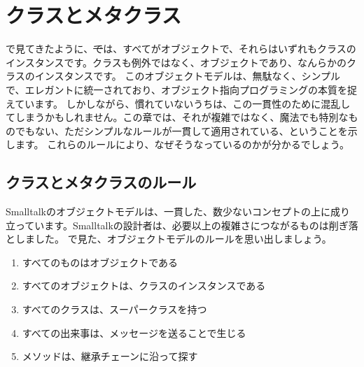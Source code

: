 \documentclass[a4paper,10pt,twoside]{book}
\begin{document}
	\renewcommand{\nnbb}[2]{} %
	\sloppy
\fi
\chapter{クラスとメタクラス}


で見てきたように、\st では、すべてがオブジェクトで、それらはいずれもクラスのインスタンスです。クラスも例外ではなく、オブジェクトであり、なんらかのクラスのインスタンスです。
このオブジェクトモデルは、無駄なく、シンプルで、エレガントに統一されており、オブジェクト指向プログラミングの本質を捉えています。
しかしながら、慣れていないうちは、この一貫性のために混乱してしまうかもしれません。この章では、それが複雑ではなく、魔法でも特別なものでもない、ただシンプルなルールが一貫して適用されている、ということを示します。
これらのルールにより、なぜそうなっているのかが分かるでしょう。

\section{クラスとメタクラスのルール}

Smalltalkのオブジェクトモデルは、一貫した、数少ないコンセプトの上に成り立っています。Smalltalkの設計者は、必要以上の複雑さにつながるものは削ぎ落としました。
で見た、オブジェクトモデルのルールを思い出しましょう。

\begin{enumerate}[label={\textbf{Rule \arabic{*}}.}, ref={Rule \arabic{*}}, leftmargin=*, widest=10]
\item{} %
	すべてのものはオブジェクトである

\item{} %
	すべてのオブジェクトは、クラスのインスタンスである

\item{} %
	すべてのクラスは、スーパークラスを持つ

\item{} %
	すべての出来事は、メッセージを送ることで生じる

\item{} %
	メソッドは、継承チェーンに沿って探す

\end{enumerate}
\end{document}
